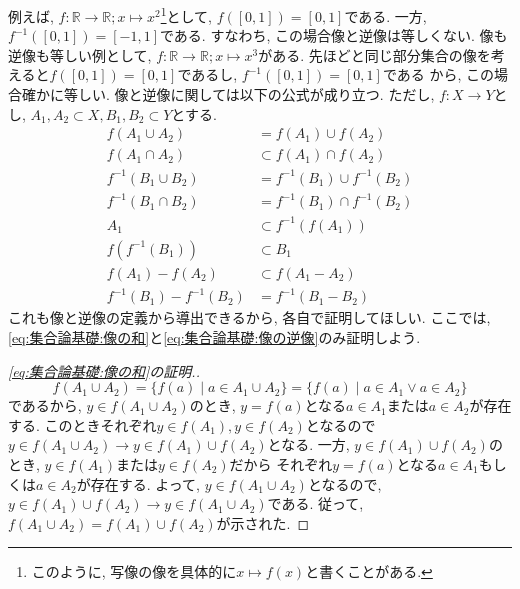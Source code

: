 \documentclass[a4j,dvipdfmx]{jsarticle}
\numberwithin{equation}{section}
\begin{document}
            例えば, $f:\mathbb{R}\rightarrow \mathbb{R};x\mapsto x^2$\footnote{このように, 写像の像を具体的に$x\mapsto f(x)$と書くことがある.}として, $f([0,1])=[0,1]$である. 一方, $f^{-1}([0,1])=[-1,1]$である. 
            すなわち, この場合像と逆像は等しくない. 像も逆像も等しい例として, $f:\mathbb{R}\rightarrow \mathbb{R};x\mapsto x^3$がある. 先ほどと同じ部分集合の像を考えると$f([0,1])=[0,1]$であるし, $f^{-1}([0,1])=[0,1]$である
            から, この場合確かに等しい.
            \clearpage
            像と逆像に関しては以下の公式が成り立つ. ただし, $f:X\rightarrow Y$とし, $A_1,A_2\subset X,B_1,B_2\subset Y$とする.
            \begin{align}
                f(A_1 \cup A_2)&=f(A_1)\cup f(A_2) \label{eq:集合論基礎:像の和}\\
                f(A_1 \cap A_2)&\subset f(A_1)\cap f(A_2) \label{eq:集合論基礎:像の積}\\
                f^{-1}(B_1 \cup B_2)&=f^{-1}(B_1)\cup f^{-1}(B_2) \label{eq:集合論基礎:逆像の和}\\    
                f^{-1}(B_1 \cap B_2)&=f^{-1}(B_1)\cap f^{-1}(B_2) \label{eq:集合論基礎:逆像の積}\\    
                A_1 &\subset f^{-1}(f(A_1)) \label{eq:集合論基礎:像の逆像}\\
                f(f^{-1}(B_1)) &\subset B_1 \label{eq:集合論基礎:逆像の像}\\
                f(A_1)-f(A_2) &\subset f(A_1-A_2) \label{eq:集合論基礎:像の差}\\
                f^{-1}(B_1)-f^{-1}(B_2) &= f^{-1}(B_1-B_2) \label{eq:集合論基礎:逆像の差}
            \end{align}
            これも像と逆像の定義から導出できるから, 各自で証明してほしい. ここでは, \eqref{eq:集合論基礎:像の和}と\eqref{eq:集合論基礎:像の逆像}のみ証明しよう.
            \begin{proof}[\eqref{eq:集合論基礎:像の和}の証明.]
                \begin{equation*}
                    f(A_1\cup A_2)=\{f(a)\mid a\in A_1\cup A_2\}=\{f(a)\mid a\in A_1\lor a\in A_2\}
                \end{equation*}
                であるから, $y\in f(A_1\cup A_2)$のとき, $y=f(a)$となる$a\in A_1$または$a\in A_2$が存在する. このときそれぞれ$y\in f(A_1),y\in f(A_2)$となるので
                $y\in f(A_1\cup A_2)\rightarrow y\in f(A_1)\cup f(A_2)$となる. 一方, $y\in f(A_1)\cup f(A_2)$のとき, $y\in f(A_1)$または$y\in f(A_2)$だから
                それぞれ$y=f(a)$となる$a\in A_1$もしくは$a\in A_2$が存在する. よって, $y\in f(A_1\cup A_2)$となるので, $y\in f(A_1)\cup f(A_2)\rightarrow y\in f(A_1\cup A_2)$である.
                従って, $f(A_1\cup A_2)=f(A_1)\cup f(A_2)$が示された.
            \end{proof}
\end{document}
